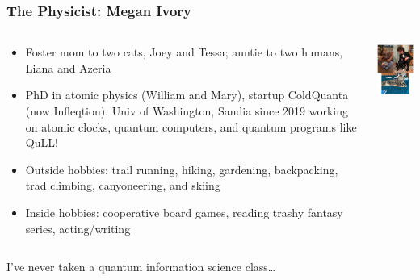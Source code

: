 \documentclass{beamer}
\begin{document}
\begin{frame}
\frametitle{The Physicist: Megan Ivory}
\begin{columns}
\begin{column}{8cm}
\begin{itemize}
\item Foster mom to two cats, Joey and Tessa; auntie to two humans, Liana and Azeria
\item PhD in atomic physics (William and Mary), startup ColdQuanta (now Infleqtion), Univ of Washington, Sandia since 2019 working on atomic clocks, quantum computers, and quantum programs like QuLL!
\item Outside hobbies: trail running, hiking, gardening, backpacking, trad climbing, canyoneering, and skiing
\item Inside hobbies: cooperative board games, reading trashy fantasy series, acting/writing
\end{itemize}
\end{column}
\begin{column}{3.5cm}
\begin{center}
\includegraphics[width=3.5cm]{fig/meganfam.jpg}
\end{center}
\end{column}
\end{columns}

\vspace{0.5cm}

I’ve never taken a quantum information science class…
\end{frame}
\end{document}
